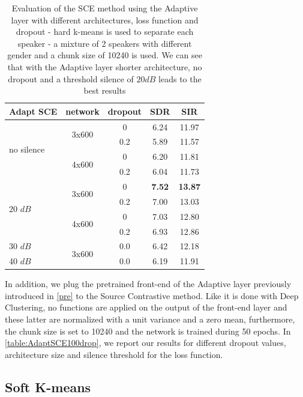 \documentclass[master, tikz, final,11pt, dvipdfmx]{iscs-thesis}
\begin{document}
\begin{table}[h!]
\centering
\begin{tabular}{l|c|c|c|c}
Adapt SCE & network & dropout & SDR & SIR \\ 
\hline
\multirow{4}{*}{no silence}  & \multirow{2}{*}{3x600} & 0 & 6.24 & 11.97 \\ 
\cline{3-5}
 &  & 0.2 & 5.89 & 11.57 \\
\cline{2-5}
 & \multirow{2}{*}{4x600} & 0 & 6.20 & 11.81 \\
\cline{3-5}
 &  & 0.2 & 6.04 & 11.73 \\
\hline
\multirow{4}{*}{20 $dB$}  & \multirow{2}{*}{3x600} & 0 & \textbf{7.52} & \textbf{13.87} \\ 
\cline{3-5}
 &  & 0.2 & 7.00 & 13.03 \\
\cline{2-5}
 & \multirow{2}{*}{4x600} & 0 & 7.03 & 12.80 \\
\cline{3-5}
 &  & 0.2 & 6.93 & 12.86 \\
\hline
30 $dB$ & \multirow{2}{*}{3x600} & 0.0 & 6.42 & 12.18 \\
\cline{1-1}\cline{3-5}
40 $dB$ &  & 0.0 & 6.19 & 11.91 \\
\end{tabular}
\caption{Evaluation of the SCE method using the Adaptive layer with different architectures, loss function and dropout - hard k-means is used to separate each speaker - a mixture of 2 speakers with different gender and a chunk size of 10240 is used. We can see that with the Adaptive layer shorter architecture, no dropout and a threshold silence of $20dB$ leads to the best results}
\label{table:AdaptSCE100drop}
\end{table}

In addition, we plug the pretrained front-end of the Adaptive layer previously introduced in \autoref{pre} to the Source Contrastive method. Like it is done with Deep Clustering, no functions are applied on the output of the front-end layer and these latter are normalized with a unit variance and a zero mean, furthermore, the chunk size is set to 10240 and the network is trained during 50 epochs.
In \autoref{table:AdaptSCE100drop}, we report our results for different dropout values, architecture size and silence threshold for the loss function.


\subsection{Soft K-means}
\label{softkmeans}
\end{document}

